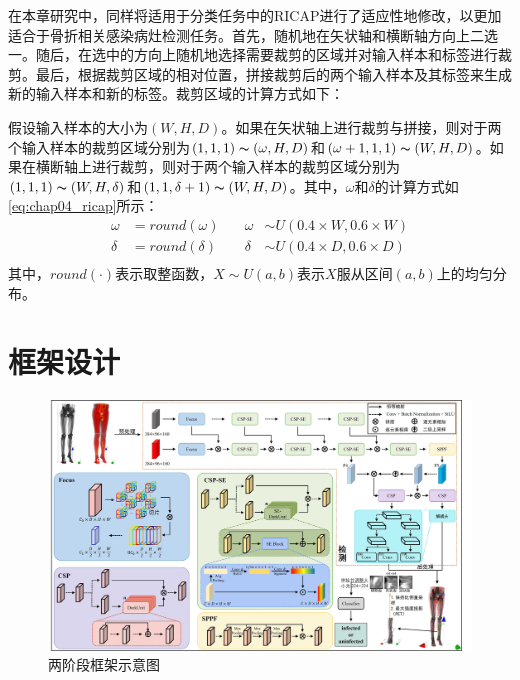 在本章研究中，同样将适用于分类任务中的RICAP进行了适应性地修改，以更加适合于骨折相关感染病灶检测任务。首先，随机地在矢状轴和横断轴方向上二选一。随后，在选中的方向上随机地选择需要裁剪的区域并对输入样本和标签进行裁剪。最后，根据裁剪区域的相对位置，拼接裁剪后的两个输入样本及其标签来生成新的输入样本和新的标签。裁剪区域的计算方式如下：

假设输入样本的大小为\((W,H,D)\)。如果在矢状轴上进行裁剪与拼接，则对于两个输入样本的裁剪区域分别为\((1, 1, 1)\thicksim (\omega, H, D)\)和\((\omega + 1, 1, 1)\thicksim (W, H, D)\)。如果在横断轴上进行裁剪，则对于两个输入样本的裁剪区域分别为\((1, 1, 1)\thicksim (W, H, \delta)\)和\((1, 1, \delta + 1)\thicksim (W, H, D)\)。其中，\(\omega\)和\(\delta\)的计算方式如\ref{eq:chap04_ricap}所示：
\begin{equation}
  \begin{aligned}
    \omega & = round(\omega) & \quad \omega & \sim U(0.4\times W, 0.6 \times W) \\
    \delta & = round(\delta) & \quad \delta & \sim U(0.4\times D, 0.6 \times D) \\
  \end{aligned}
  \label{eq:chap04_ricap}
\end{equation}
其中，\(round(\cdot)\)表示取整函数，\(X \sim U(a, b)\)表示\(X\)服从区间\((a,b)\)上的均匀分布。

\section{框架设计}

\begin{figure}
  \centering
  \includegraphics[width=0.95\textheight,height=\textwidth,angle=90,keepaspectratio]{figures/chap04_model.jpg}
  \caption{两阶段框架示意图}
  \label{fig:chap04_model}
\end{figure}


